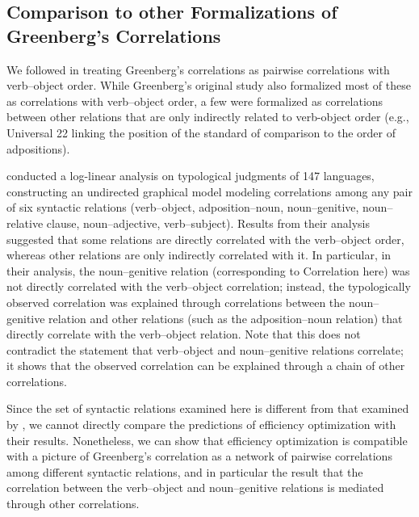 \documentclass[10pt,twoside,lineno]{article}
\begin{document}
\subsection{Comparison to other Formalizations of Greenberg's Correlations}

We followed \citet{dryer1992greenbergian} in treating Greenberg's correlations as pairwise correlations with verb--object order.
While Greenberg's original study \cite{greenberg1963universals} also formalized most of these as correlations with verb--object order, a few were formalized as correlations between other relations that are only indirectly related to verb-object order (e.g., Universal 22 linking the position of the standard of comparison to the order of adpositions).

\citet{justeson1990explanation} conducted a log-linear analysis on typological judgments of 147 languages, constructing an undirected graphical model modeling correlations among any pair of six syntactic relations (verb--object, adposition--noun, noun--genitive, noun--relative clause, noun--adjective, verb--subject).
Results from their analysis suggested that some relations are directly correlated with the verb--object order, whereas other relations are only indirectly correlated with it.
In particular, in their analysis, the noun--genitive relation (corresponding to Correlation  here) was not directly correlated with the verb--object correlation; instead, the typologically observed correlation was explained through correlations between the noun--genitive relation and other relations (such as the adposition--noun relation) that directly correlate with the verb--object relation.
Note that this does not contradict the statement that verb--object and noun--genitive relations correlate; it shows that the observed correlation can be explained through a chain of other correlations.

Since the set of syntactic relations examined here is different from that examined by \citet{justeson1990explanation}, we cannot directly compare the predictions of efficiency optimization with their results.
Nonetheless, we can show that efficiency optimization is compatible with a picture of Greenberg's correlation as a network of pairwise correlations among different syntactic relations, and in particular the result that the correlation between the verb--object and noun--genitive relations is mediated through other correlations.
\end{document}
